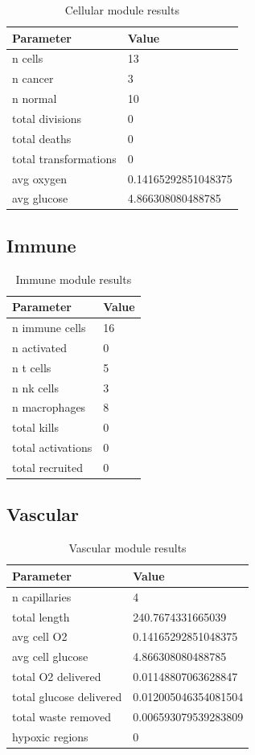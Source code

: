 \documentclass[12pt]{article}
\begin{document}
\begin{table}[h]
\centering
\begin{tabular}{ll}
\toprule
Parameter & Value \\
\midrule
n cells & 13 \\
n cancer & 3 \\
n normal & 10 \\
total divisions & 0 \\
total deaths & 0 \\
total transformations & 0 \\
avg oxygen & 0.14165292851048375 \\
avg glucose & 4.866308080488785 \\
\bottomrule
\end{tabular}
\caption{Cellular module results}
\end{table}

\subsection{Immune}

\begin{table}[h]
\centering
\begin{tabular}{ll}
\toprule
Parameter & Value \\
\midrule
n immune cells & 16 \\
n activated & 0 \\
n t cells & 5 \\
n nk cells & 3 \\
n macrophages & 8 \\
total kills & 0 \\
total activations & 0 \\
total recruited & 0 \\
\bottomrule
\end{tabular}
\caption{Immune module results}
\end{table}

\subsection{Vascular}

\begin{table}[h]
\centering
\begin{tabular}{ll}
\toprule
Parameter & Value \\
\midrule
n capillaries & 4 \\
total length & 240.7674331665039 \\
avg cell O2 & 0.14165292851048375 \\
avg cell glucose & 4.866308080488785 \\
total O2 delivered & 0.01148807063628847 \\
total glucose delivered & 0.012005046354081504 \\
total waste removed & 0.006593079539283809 \\
hypoxic regions & 0 \\
\bottomrule
\end{tabular}
\caption{Vascular module results}
\end{table}
\end{document}
